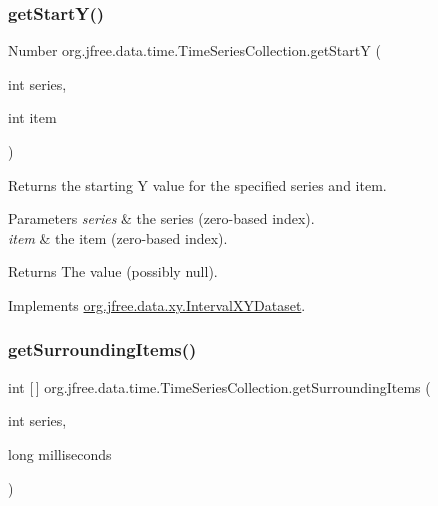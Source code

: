 \subsubsection{\texorpdfstring{get\+Start\+Y()}{getStartY()}}
{\footnotesize\ttfamily Number org.\+jfree.\+data.\+time.\+Time\+Series\+Collection.\+get\+StartY (\begin{DoxyParamCaption}\item[{int}]{series,  }\item[{int}]{item }\end{DoxyParamCaption})}

Returns the starting Y value for the specified series and item.


\begin{DoxyParams}{Parameters}
{\em series} & the series (zero-\/based index). \\
\hline
{\em item} & the item (zero-\/based index).\\
\hline
\end{DoxyParams}
\begin{DoxyReturn}{Returns}
The value (possibly {\ttfamily null}). 
\end{DoxyReturn}


Implements \mbox{\hyperlink{interfaceorg_1_1jfree_1_1data_1_1xy_1_1_interval_x_y_dataset_afdd414735adb233734bc35b76a005ed9}{org.\+jfree.\+data.\+xy.\+Interval\+X\+Y\+Dataset}}.

\mbox{\label{classorg_1_1jfree_1_1data_1_1time_1_1_time_series_collection_a9762237c520a0a01830db8665c543da3}} 
\subsubsection{\texorpdfstring{get\+Surrounding\+Items()}{getSurroundingItems()}}
{\footnotesize\ttfamily int \mbox{[}$\,$\mbox{]} org.\+jfree.\+data.\+time.\+Time\+Series\+Collection.\+get\+Surrounding\+Items (\begin{DoxyParamCaption}\item[{int}]{series,  }\item[{long}]{milliseconds }\end{DoxyParamCaption})}

